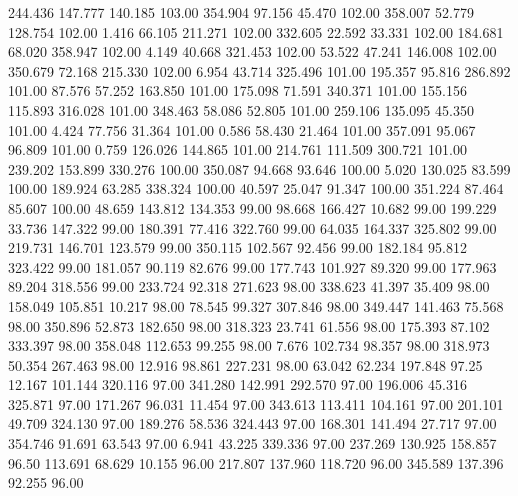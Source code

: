  244.436  147.777  140.185       103.00
 354.904   97.156   45.470       102.00
 358.007   52.779  128.754       102.00
   1.416   66.105  211.271       102.00
 332.605   22.592   33.331       102.00
 184.681   68.020  358.947       102.00
   4.149   40.668  321.453       102.00
  53.522   47.241  146.008       102.00
 350.679   72.168  215.330       102.00
   6.954   43.714  325.496       101.00
 195.357   95.816  286.892       101.00
  87.576   57.252  163.850       101.00
 175.098   71.591  340.371       101.00
 155.156  115.893  316.028       101.00
 348.463   58.086   52.805       101.00
 259.106  135.095   45.350       101.00
   4.424   77.756   31.364       101.00
   0.586   58.430   21.464       101.00
 357.091   95.067   96.809       101.00
   0.759  126.026  144.865       101.00
 214.761  111.509  300.721       101.00
 239.202  153.899  330.276       100.00
 350.087   94.668   93.646       100.00
   5.020  130.025   83.599       100.00
 189.924   63.285  338.324       100.00
  40.597   25.047   91.347       100.00
 351.224   87.464   85.607       100.00
  48.659  143.812  134.353        99.00
  98.668  166.427   10.682        99.00
 199.229   33.736  147.322        99.00
 180.391   77.416  322.760        99.00
  64.035  164.337  325.802        99.00
 219.731  146.701  123.579        99.00
 350.115  102.567   92.456        99.00
 182.184   95.812  323.422        99.00
 181.057   90.119   82.676        99.00
 177.743  101.927   89.320        99.00
 177.963   89.204  318.556        99.00
 233.724   92.318  271.623        98.00
 338.623   41.397   35.409        98.00
 158.049  105.851   10.217        98.00
  78.545   99.327  307.846        98.00
 349.447  141.463   75.568        98.00
 350.896   52.873  182.650        98.00
 318.323   23.741   61.556        98.00
 175.393   87.102  333.397        98.00
 358.048  112.653   99.255        98.00
   7.676  102.734   98.357        98.00
 318.973   50.354  267.463        98.00
  12.916   98.861  227.231        98.00
  63.042   62.234  197.848        97.25
  12.167  101.144  320.116        97.00
 341.280  142.991  292.570        97.00
 196.006   45.316  325.871        97.00
 171.267   96.031   11.454        97.00
 343.613  113.411  104.161        97.00
 201.101   49.709  324.130        97.00
 189.276   58.536  324.443        97.00
 168.301  141.494   27.717        97.00
 354.746   91.691   63.543        97.00
   6.941   43.225  339.336        97.00
 237.269  130.925  158.857        96.50
 113.691   68.629   10.155        96.00
 217.807  137.960  118.720        96.00
 345.589  137.396   92.255        96.00
